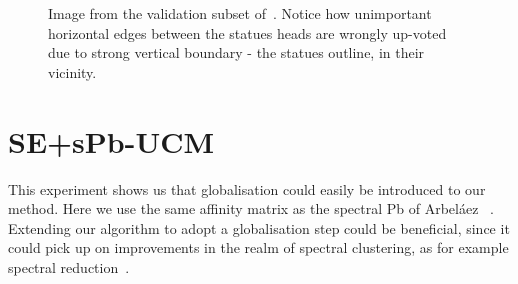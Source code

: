 \begin{figure}[ht!]
\centering
{}
\caption{Image from the validation subset of~\cite{BSDS500resources}. Notice how unimportant horizontal edges between the statues heads are wrongly up-voted due to strong vertical boundary - the statues outline, in their vicinity.}
\label{fig:SE-UCM-tikis-bleeding}
\end{figure}

\section*{SE+sPb-UCM}
This experiment shows us that globalisation could easily be introduced to our method. Here we use the same affinity matrix as the spectral Pb of Arbel\'aez \etal~\cite{Arbelaez11}. Extending our algorithm to adopt a globalisation step could be beneficial, since it could pick up on improvements in the realm of spectral clustering, as for example spectral reduction~\cite{Galasso14}. %

